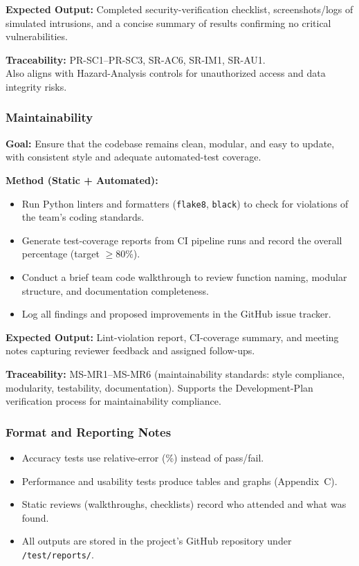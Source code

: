 \documentclass[12pt, titlepage]{article}
\begin{document}
\textbf{Expected Output:} Completed security-verification checklist, screenshots/logs of simulated intrusions, and a concise summary of results confirming no critical vulnerabilities.

\textbf{Traceability:} PR-SC1--PR-SC3, SR-AC6, SR-IM1, SR-AU1.\\
Also aligns with Hazard-Analysis controls for unauthorized access and data integrity risks.

\subsubsection{Maintainability}
\label{subsubsec:maintainability}

\textbf{Goal:} Ensure that the codebase remains clean, modular, and easy to update, with consistent style and adequate automated-test coverage.

\textbf{Method (Static + Automated):}
\begin{itemize}
  \item Run Python linters and formatters (\texttt{flake8}, \texttt{black}) to check for violations of the team’s coding standards.
  \item Generate test-coverage reports from CI pipeline runs and record the overall percentage (target \(\ge 80\%\)).
  \item Conduct a brief team code walkthrough to review function naming, modular structure, and documentation completeness.
  \item Log all findings and proposed improvements in the GitHub issue tracker.
\end{itemize}

\textbf{Expected Output:} Lint-violation report, CI-coverage summary, and meeting notes capturing reviewer feedback and assigned follow-ups.

\textbf{Traceability:} MS-MR1--MS-MR6 (maintainability standards: style compliance, modularity, testability, documentation). Supports the Development-Plan verification process for maintainability compliance.

\subsubsection*{Format and Reporting Notes}
\begin{itemize}
  \item Accuracy tests use relative-error (\%) instead of pass/fail.
  \item Performance and usability tests produce tables and graphs (Appendix~C).
  \item Static reviews (walkthroughs, checklists) record who attended and what was found.
  \item All outputs are stored in the project’s GitHub repository under \texttt{/test/reports/}.
\end{itemize}
\end{document}
